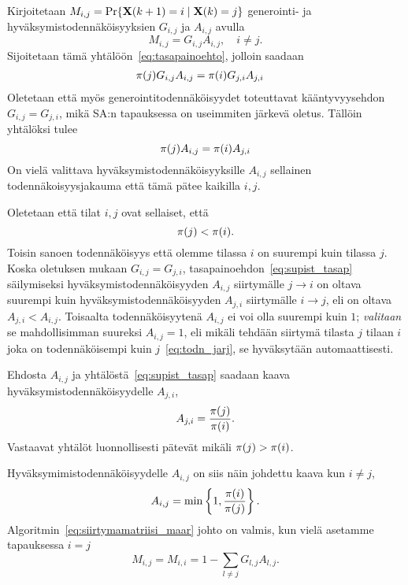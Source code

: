Kirjoitetaan $M_{i,j} = \Pr\{\mathbf{X}(k+1) = i \mid \mathbf{X}(k) = j\}$ generointi- ja hyväksymistodennäköisyyksien $G_{i,j}$ ja $A_{i,j}$ avulla
\begin{equation*}
    M_{i,j} = G_{i,j}A_{i,j}, \quad i \not = j.
\end{equation*}
Sijoitetaan tämä yhtälöön~\eqref{eq:tasapainoehto}, jolloin saadaan
\begin{align}
    \mathbf{\pi}(j) G_{i,j}A_{i,j} &= \mathbf{\pi}(i) G_{j,i}A_{j,i}
\end{align}
Oletetaan että myös generointitodennäköisyydet toteuttavat kääntyvyysehdon $G_{i,j} = G_{j,i}$,
mikä SA:n tapauksessa on useimmiten järkevä oletus.
Tällöin yhtälöksi tulee
\begin{equation}
    \label{eq:supist_tasap}
    \mathbf{\pi}(j) A_{i,j} = \mathbf{\pi}(i) A_{j,i}
\end{equation}
On vielä valittava hyväksymistodennäköisyyksille $A_{i,j}$ sellainen todennäkoisyysjakauma että tämä pätee kaikilla $i,j$.

Oletetaan että tilat $i,j$ ovat sellaiset, että
\begin{equation}
    \label{eq:todn_jarj}
    \mathbf{\pi}(j) < \mathbf{\pi}(i).
\end{equation}
Toisin sanoen todennäköisyys että olemme tilassa $i$ on suurempi kuin tilassa $j$.
Koska oletuksen mukaan $G_{i,j} = G_{j,i}$,
tasapainoehdon~\eqref{eq:supist_tasap} säilymiseksi hyväksymistodennäköisyyden $A_{i,j}$ siirtymälle $j \to i$  on oltava suurempi kuin hyväksymistodennäköisyyden $A_{j,i}$ siirtymälle $i \to j$,
eli on oltava $A_{j,i} < A_{i,j}$.
Toisaalta todennäköisyytenä $A_{i,j}$ ei voi olla suurempi kuin $1$;
\emph{valitaan} se mahdollisimman suureksi $A_{i,j} = 1$,
eli mikäli tehdään siirtymä tilasta $j$ tilaan $i$ joka on todennäköisempi kuin $j$~\eqref{eq:todn_jarj},
se hyväksytään automaattisesti.

Ehdosta $A_{i,j}$ ja yhtälöstä~\eqref{eq:supist_tasap} saadaan kaava hyväksymistodennäköisyydelle $A_{j,i}$,
\begin{equation}
    A_{j,i} = \frac{\mathbf{\pi}(j)}{\mathbf{\pi}(i)}.
\end{equation}
Vastaavat yhtälöt luonnollisesti pätevät mikäli $\mathbf{\pi}(j) > \mathbf{\pi}(i)$.

Hyväksymimistodennäköisyydelle $A_{i,j}$ on siis näin johdettu kaava kun $i\not=j$,
\begin{equation}
    \label{eq:yleinen_metropolis}
    A_{i,j} = \min\left\{1, \frac{\mathbf{\pi}(i)}{\mathbf{\pi}(j)}\right\}.
\end{equation}
Algoritmin~\eqref{eq:siirtymamatriisi_maar} johto on valmis, kun vielä asetamme tapauksessa $i=j$
\begin{equation}
    M_{i,j} = M_{i,i} =  1 - \sum_{l\not =j} G_{l,j}A_{l,j}.
\end{equation}

